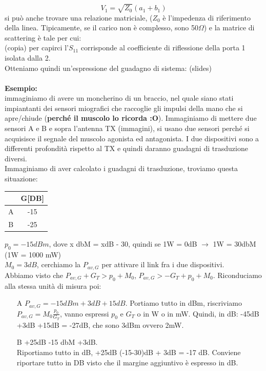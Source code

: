 \documentclass[oneside, 12pt]{extbook}
\begin{document}
\begin{equation}
	V_1 = \sqrt{Z_0}(a_1 + b_1)
\end{equation}
si può anche trovare una relazione matriciale, ($Z_0$ è l'impedenza di riferimento della linea. Tipicamente, se il carico non è complesso, sono 50$\Omega$) e la matrice di scattering è tale per cui:\\ (copia) per capirci l'$S_{11}$ corrisponde al coefficiente di riflessione della porta 1 isolata dalla 2.\\Otteniamo quindi un'espressione del guadagno di sistema: (slides)\\\\\textbf{Esempio:}\\
immaginiamo di avere un moncherino di un braccio, nel quale siano stati impiantanti dei sensori miografici che raccoglie gli impulsi della mano che si apre/chiude (\textbf{perché il muscolo lo ricorda :O}). Immaginiamo di mettere due sensori A e B e sopra l'antenna TX (immagini), si usano due sensori perché si acquisisce il segnale del muscolo agonista ed antagonista. I due dispositivi sono a differenti profondità rispetto al TX e quindi daranno guadagni di trasduzione diversi.\\Immaginiamo di aver calcolato i guadagni di trasduzione, troviamo questa situazione:
\begin{table}
	\begin{tabular}{|c|c}
		 & G[DB]\\
		 \hline
		 A & -15\\
		 B & -25\\
	\end{tabular}
\end{table}
$p_0 = -15 dBm$, dove x dbM = xdB - 30, quindi se 1W = 0dB $\rightarrow$ 1W = 30dbM (1W = 1000 mW)\\$M_0 = 3dB$, cerchiamo la $P_{av,G}$ per attivare il link fra i due dispositivi.\\Abbiamo visto che $P_{av,G} + G_T > p_0 + M_0$, $P_{av,G} > -G_T + p_0 + M_0$. Riconduciamo alla stessa unità di misura poi:
\begin{itemize}
	\item[A] $P_{av,G} = -15dBm + 3dB + 15dB$. Portiamo tutto in dBm, riscriviamo $P_{av,G} = M_0\frac{p_0}{G_T}$, vanno espressi $p_0$ e $G_T$ o in W o in mW. Quindi, in dB: -45dB +3dB +15dB = -27dB, che sono 3dBm ovvero 2mW.
	\item[B] +25dB -15 dbM +3dB.\\Riportiamo tutto in dB, +25dB (-15-30)dB + 3dB = -17 dB. Conviene riportare tutto in DB visto che il margine aggiuntivo è espresso in dB.
\end{itemize}
\end{document}
